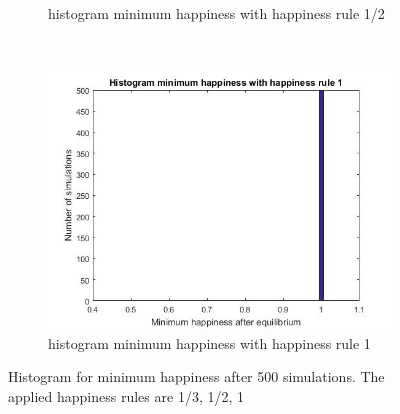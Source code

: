\begin{figure}[H]
\begin{subfigure}{0.32\textwidth}
        \caption{histogram minimum happiness with happiness rule 1/2}
        \label{fig:tiger}
    \end{subfigure}
    ~ %
    \begin{subfigure}{0.32\textwidth}
        \includegraphics[width=\textwidth]{histogram_min_happiness_een}
        \caption{histogram minimum happiness with happiness rule 1}
        \label{minimal happiness 1}
    \end{subfigure}
    \caption{Histogram for minimum happiness after 500 simulations. The applied happiness rules are 1/3, 1/2, 1 }
    \label{minhappy}
\end{figure}
